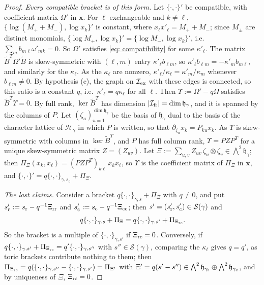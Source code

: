 \documentclass[a4paper]{amsart}
\numberwithin{equation}{section}
\theoremstyle{definition}
\theoremstyle{remark}
\newcommand{\mfh}{\mathfrak{h}}
\newcommand{\mcH}{\mathcal{H}}
\newcommand{\mcS}{\mathcal{S}}
\newcommand{\mcI}{\mathcal{I}}
\newcommand{\bx}{\mathbf{x}}
\newcommand{\tB}{\widetilde{B}}
\newcommand{\rr}{{\rm r}}
\newcommand{\cc}{{\rm c}}
\newcommand{\ex}{{\rm ex}}
\newcommand{\fr}{{\rm fr}}
\newcommand{\toric}{\Pi}
\begin{document}
\begin{proof}
  \emph{Every compatible bracket is of this form.}
  Let $\{\cdot,\cdot\}'$ be compatible, with coefficient matrix $\Omega'$ in $\bx$.
  For $\ell$ exchangeable and $k\neq\ell$, $\{\log(M_++M_-),\log x_k\}'$ is constant, where $x_\ell x'_\ell=M_++M_-$; since $M_\pm$ are distinct monomials, $\{\log M_+,\log x_k\}'=\{\log M_-,\log x_k\}'$, i.e.\ $\sum_{m}b_{m\ell}\omega'_{mk}=0$.
  So $\Omega'$ satisfies \eqref{eq: compatibility} for some $\kappa'_\ell$.
  The matrix $\tB^T\Omega'\tB$ is skew-symmetric with $(\ell,m)$ entry $\kappa'_\ell b_{\ell m}$, so $\kappa'_\ell b_{\ell m}=-\kappa'_mb_{m\ell}$, and similarly for the $\kappa_\ell$. As the $\kappa_\ell$ are nonzero, $\kappa'_\ell/\kappa_\ell=\kappa'_m/\kappa_m$ whenever $b_{\ell m}\neq0$. By hypothesis (c), the graph on $\mcI_\ex$ with these edges is connected, so this ratio is a constant $q$, i.e.\ $\kappa'_\ell=q\kappa_\ell$ for all $\ell$.
  Then $\Upsilon:=\Omega'-q\Omega$ satisfies $\tB^T\Upsilon=0$.
  By full rank, $\ker\tB^T$ has dimension $|\mcI_\fr|=\dim\mfh_\gamma$, and it is spanned by the columns of $P$.
  Let $(\zeta_u)_{u=1}^{\dim\mfh_\gamma}$ be the basis of $\mfh_\gamma$ dual to the basis of the character lattice of $\mcH_\gamma$ in which $P$ is written, so that $\partial_{\zeta_u}x_k=P_{ku}x_k$.
  As $\Upsilon$ is skew-symmetric with columns in $\ker\tB^T$, and $P$ has full column rank, $\Upsilon=PZP^T$ for a unique skew-symmetric matrix $Z=(Z_{uv})$.
  Let $\Xi:=\sum_{u,v}Z_{uv}\,\zeta_u\otimes\zeta_v\in\bigwedge^2\mfh_\gamma$; then $\toric_\Xi(x_k,x_\ell)=(PZP^T)_{k\ell}\,x_kx_\ell$, so $\Upsilon$ is the coefficient matrix of $\toric_\Xi$ in $\bx$, and $\{\cdot,\cdot\}'=q\{\cdot,\cdot\}_{\gamma,s_0}+\toric_\Xi$.

  \emph{The last claims.}
  Consider a bracket $q\{\cdot,\cdot\}_{\gamma,s}+\toric_\Xi$ with $q\neq0$, and put $s'_{\rr}:=s_{\rr}-q^{-1}\Xi_{\rm rr}$ and $s'_{\cc}:=s_{\cc}-q^{-1}\Xi_{\rm cc}$; then $s'=(s'_{\rr},s'_{\cc})\in\mcS(\gamma)$ and
  \[
    q\{\cdot,\cdot\}_{\gamma,s}+\toric_\Xi=q\{\cdot,\cdot\}_{\gamma,s'}+\toric_{\Xi_{\rm rc}}.
  \]
  So the bracket is a multiple of $\{\cdot,\cdot\}_{\gamma,s'}$ if $\Xi_{\rm rc}=0$.
  Conversely, if $q\{\cdot,\cdot\}_{\gamma,s'}+\toric_{\Xi_{\rm rc}}=q'\{\cdot,\cdot\}_{\gamma,s''}$ with $s''\in\mcS(\gamma)$, comparing the $\kappa_\ell$ gives $q=q'$, as toric brackets contribute nothing to them; then $\toric_{\Xi_{\rm rc}}=q(\{\cdot,\cdot\}_{\gamma,s''}-\{\cdot,\cdot\}_{\gamma,s'})=\toric_{\Xi'}$ with $\Xi'=q(s'-s'')\in\bigwedge^2\mfh_{\gamma_{\rr}}\oplus\bigwedge^2\mfh_{\gamma_{\cc}}$, and by uniqueness of $\Xi$, $\Xi_{\rm rc}=0$.

\end{proof}
\end{document}

